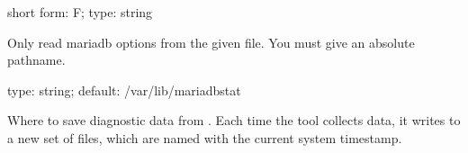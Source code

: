 \documentclass[letterpaper,10pt,english]{sphinxmanual}
\begin{document}
\begin{fulllineitems}
\label{\detokenize{mariadb-stat:cmdoption-mariadb-stat-defaults-file}}
\sphinxAtStartPar
short form: \sphinxhyphen{}F; type: string

\sphinxAtStartPar
Only read mariadb options from the given file.  You must give an absolute
pathname.

\end{fulllineitems}


\begin{fulllineitems}
\label{\detokenize{mariadb-stat:cmdoption-mariadb-stat-dest}}
\sphinxAtStartPar
type: string; default: /var/lib/mariadb\sphinxhyphen{}stat

\sphinxAtStartPar
Where to save diagnostic data from {\hyperref[\detokenize{mariadb-stat:cmdoption-mariadb-stat-collect}]{}}.  Each time the tool
collects data, it writes to a new set of files, which are named with the
current system timestamp.

\end{fulllineitems}

\end{document}
